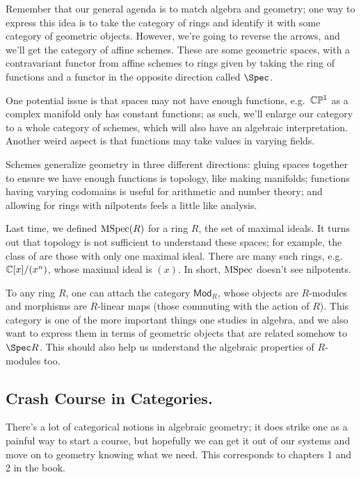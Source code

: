 \begin{quote}\textit{
}\end{quote}
Remember that our general agenda is to match algebra and geometry; one way to express this idea is to take the
category of rings and identify it with some category of geometric objects. However, we're going to reverse the
arrows, and we'll get the category of affine schemes. These are some geometric spaces, with a contravariant functor
from affine schemes to rings given by taking the ring of functions and a functor in the opposite direction called
\(\Spec\).

One potential issue is that spaces may not have enough functions, e.g.\ \(\mathbb C\mathbb P^1\) as a complex manifold only has
constant functions; as such, we'll enlarge our category to a whole category of schemes, which will also have an
algebraic interpretation. Another weird aspect is that functions may take values in varying fields.

Schemes generalize geometry in three different directions: gluing spaces together to ensure we have enough
functions is topology, like making manifolds; functions having varying codomains is useful for arithmetic and
number theory; and allowing for rings with nilpotents feels a little like analysis.

Last time, we defined \(\operatorname{MSpec}(R)\) for a ring \(R\), the set of maximal ideals. It turns out that topology is not
sufficient to understand these spaces; for example, the class of  are those with only one maximal
ideal. There are many such rings, e.g.\ \(\mathbb C[x]/(x^n)\), whose maximal ideal is \((x)\). In short, \(\operatorname{MSpec}\)
doesn't see nilpotents.

To any ring \(R\), one can attach the category \(\mathsf{Mod}_R\), whose objects are \(R\)-modules and morphisms
are \(R\)-linear maps (those commuting with the action of \(R\)). This category is one of the more important things
one studies in algebra, and we also want to express them in terms of geometric objects that are related somehow to
\(\Spec R\). This should also help us understand the algebraic properties of \(R\)-modules too.
\subsection*{Crash Course in Categories.}
There's a lot of categorical notions in algebraic geometry; it does strike one as a painful way to start a course,
but hopefully we can get it out of our systems and move on to geometry knowing what we need. This corresponds to
chapters 1 and 2 in the book.

